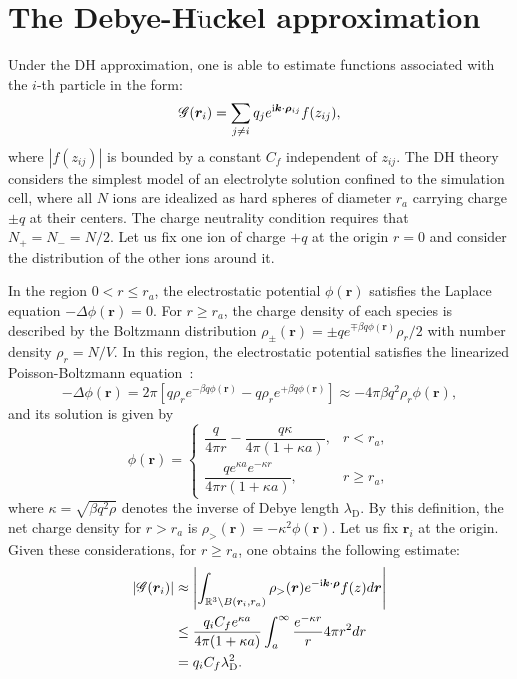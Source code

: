 \section{The Debye-H$\ddot{\text{u}}$ckel approximation}\label{app::Debye}
Under the DH approximation, one is able to estimate functions associated with the $i$-th particle in the form:
\begin{equation}
	\mathscr{G}(\bm{r}_i)=\sum_{j\neq i}q_{j}e^{\mathrm{i} \bm{k}\cdot\bm{\rho}_{ij}}f(z_{ij}),
\end{equation}
where $|f(z_{ij})|$ is bounded by a constant $C_f$ independent of $z_{ij}$. The DH theory considers the simplest model of an electrolyte solution confined to the simulation cell, where all $N$ ions are idealized as hard spheres of diameter $r_{a}$ carrying charge $\pm q$ at their centers. The charge neutrality condition requires that $N_+=N_-=N/2$. Let us fix one ion of charge $+q$ at the origin $r=0$ and consider the distribution of the other ions around it.

In the region $0<r\leq r_{a}$, the electrostatic potential $\phi(\bm{r})$ satisfies the Laplace equation $-\Delta\phi(\bm{r})=0$. For $r\geq r_{a}$, the charge density of each species is described by the Boltzmann distribution $\rho_{\pm}(\bm{r})=\pm qe^{\mp\beta q\phi(\bm{r})}\rho_r/2$ with number density $\rho_r=N/V$. In this region, the electrostatic potential satisfies the linearized Poisson-Boltzmann equation~\cite{levin2002electrostatic}:
\begin{equation}
	-\Delta \phi(\bm{r})=2\pi\left[q \rho_r e^{-\beta q\phi(\bm{r})}-q\rho_r e^{+\beta q\phi(\bm{r})}\right]\approx -4\pi \beta q^2\rho_r\phi(\bm{r}),
\end{equation}
and its solution is given by
\begin{equation}
	\phi(\bm{r})=\begin{cases}
		\dfrac{q}{4\pi r}-\dfrac{q\kappa}{4\pi (1+\kappa a)},& r<r_{a},\\[1em]
		\dfrac{qe^{\kappa a}e^{-\kappa r}}{4\pi r(1+\kappa a)},&r\geq r_{a},
	\end{cases}
\end{equation}
where $\kappa=\sqrt{\beta q^2\rho}$ denotes the inverse of Debye length $\lambda_{\text{D}}$. By this definition, the net charge density for $r>r_{a}$ is $\rho_>(\bm{r})=-\kappa^2\phi(\bm{r})$. Let us fix $\bm{r}_i$ at the origin. Given these considerations, for $r\geq r_a$, one obtains the following estimate:
\begin{equation}\label{eq::E.4}
	\begin{split}
		|\mathscr{G}(\bm{r}_i)|&\approx \left|\int_{\mathbb{R}^3\backslash B(\bm{r}_{i}, r_a)}\rho_>(\bm{r})e^{-\mathrm{i} \bm{k}\cdot\bm{\rho}}f(z)d\bm{r}\right|\\
		&\leq \frac{q_iC_fe^{\kappa a}}{4\pi(1+\kappa a)}\int_{a}^{\infty}\frac{e^{-\kappa r}}{r}4\pi r^2dr\\
		&=q_iC_f\lambda_{\text{D}}^2.
	\end{split}
\end{equation}


